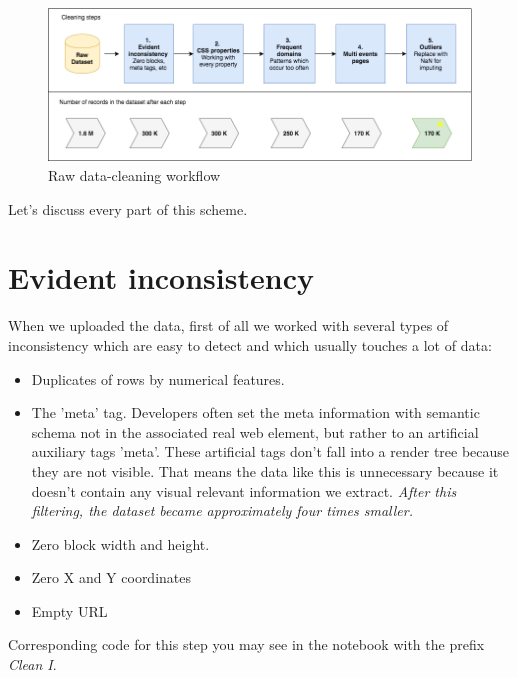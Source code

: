 \begin{figure}[h]
\begin{center}
\includegraphics[width=1.0\textwidth]{figures06/clean_workflow4}
\caption{Raw data-cleaning workflow}
\label{fig:clean}
\end{center}
\end{figure}

Let's discuss every part of this scheme.\\

\section{Evident inconsistency}

When we uploaded the data, first of all we worked with several types of inconsistency which are easy to detect and which usually touches a lot of data:

\begin{itemize}
    \item Duplicates of rows by numerical features.
    \item The 'meta' tag. Developers often set the meta information with semantic schema not in the associated real web element, but rather to an artificial auxiliary tags 'meta'. These artificial tags don't fall into a render tree because they are not visible. That means the data like this is unnecessary because it doesn't contain any visual relevant information we extract. \textit{After this filtering, the dataset became approximately four times smaller.}
    \item Zero block width and height.
    \item Zero X and Y coordinates
    \item Empty URL
\end{itemize}

Corresponding code for this step you may see in the notebook with the prefix \textit{Clean I}.


